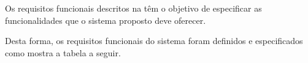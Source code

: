 Os requisitos funcionais descritos na  têm o objetivo de especificar as funcionalidades que o sistema proposto deve oferecer.

Desta forma, os requisitos funcionais do sistema foram definidos e especificados como mostra a tabela a seguir.

